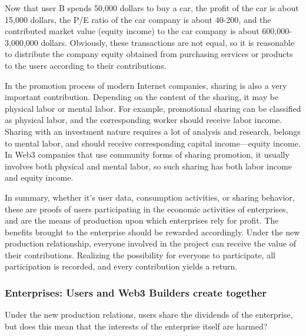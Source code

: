 \documentclass{article}
\begin{document}
Now that user B spends 50,000 dollars to buy a car, the profit of the car is about 15,000 dollars, the P/E ratio of the car company is about 40-200, and the contributed market value (equity income) to the car company is about 600,000-3,000,000 dollars. Obviously, these transactions are not equal, so it is reasonable to distribute the company equity obtained from purchasing services or products to the users according to their contributions.


In the promotion process of modern Internet companies, sharing is also a very important contribution. Depending on the content of the sharing, it may be physical labor or mental labor. For example, promotional sharing can be classified as physical labor, and the corresponding worker should receive labor income. Sharing with an investment nature requires a lot of analysis and research, belongs to mental labor, and should receive corresponding capital income—equity income. In Web3 companies that use community forms of sharing promotion, it usually involves both physical and mental labor, so such sharing has both labor income and equity income.


In summary, whether it's user data, consumption activities, or sharing behavior, these are proofs of users participating in the economic activities of enterprises, and are the means of production upon which enterprises rely for profit. The benefits brought to the enterprise should be rewarded accordingly. Under the new production relationship, everyone involved in the project can receive the value of their contributions. Realizing the possibility for everyone to participate, all participation is recorded, and every contribution yields a return.

\subsubsection{Enterprises: Users and Web3 Builders create together}

Under the new production relations, users share the dividends of the enterprise, but does this mean that the interests of the enterprise itself are harmed?
\end{document}
